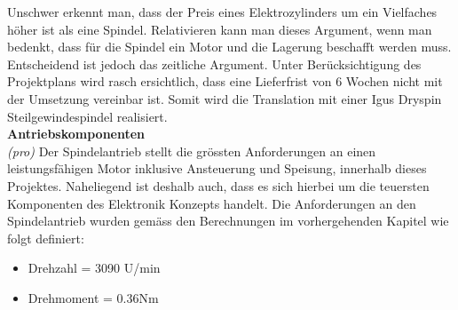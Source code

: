 Unschwer erkennt man, dass der Preis eines Elektrozylinders um ein Vielfaches höher ist als eine Spindel. Relativieren kann man dieses Argument, wenn man bedenkt, dass für die Spindel ein Motor und die Lagerung beschafft werden muss. Entscheidend ist jedoch das zeitliche Argument. Unter Berücksichtigung des Projektplans wird rasch ersichtlich, dass eine Lieferfrist von 6 Wochen nicht mit der Umsetzung vereinbar ist. Somit wird die Translation mit einer Igus Dryspin Steilgewindespindel realisiert.\\

\textbf{Antriebskomponenten}\\
\textit{(pro)} Der Spindelantrieb stellt die grössten Anforderungen an einen leistungsfähigen Motor inklusive Ansteuerung und Speisung, innerhalb dieses Projektes. Naheliegend ist deshalb auch, dass es sich hierbei um die teuersten Komponenten des Elektronik Konzepts handelt. Die Anforderungen an den Spindelantrieb wurden gemäss den Berechnungen im vorhergehenden Kapitel wie folgt definiert: 

\begin{itemize}
	\item Drehzahl = 3090 U/min
	\item Drehmoment = 0.36Nm	
\end{itemize}



